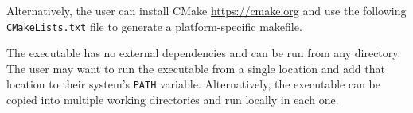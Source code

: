 Alternatively, the user can install CMake \url{https://cmake.org} and use the following \texttt{CMakeLists.txt} file to generate a platform-specific makefile.

\newpage


The executable has no external dependencies and can be run from any directory. The user may want to run the executable from a single location and add that location to their system's \texttt{PATH} variable. Alternatively, the executable can be copied into multiple working directories and run locally in each one.
